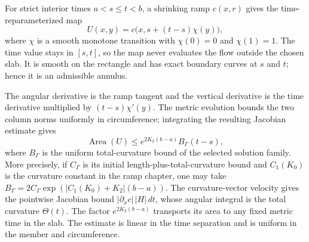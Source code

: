 \begin{lemma}\label{lem:annular-swept}
For strict interior times $a<s\le t<b$, a shrinking ramp $c(x,r)$ gives the
time-reparameterized map
\[
 U(x,y)=c\bigl(x,s+(t-s)\chi(y)\bigr),
\]
where $\chi$ is a smooth monotone transition with $\chi(0)=0$ and
$\chi(1)=1$.  The time value stays in $[s,t]$, so the map never evaluates the
flow outside the chosen slab.  It is smooth on the rectangle and has exact
boundary curves at $s$ and $t$; hence it is an admissible annulus.

The angular derivative is the ramp tangent and the vertical derivative is the
time derivative multiplied by $(t-s)\chi'(y)$.  The metric evolution bounds
the two column norms uniformly in circumference; integrating the resulting
Jacobian estimate gives
\begin{equation}
 \operatorname{Area}(U)\le
 e^{2K_2(b-a)}B_{\Gamma}(t-s),
 \label{eq:swept-area}
\end{equation}
where $B_{\Gamma}$ is the uniform total-curvature bound of the selected
solution family.  More precisely, if $C_{\Gamma}$ is its initial
length-plus-total-curvature bound and $C_1(K_0)$ is the curvature constant
in the ramp chapter, one may take
$B_{\Gamma}=2C_{\Gamma}\exp(|C_1(K_0)+K_2|(b-a))$.
The curvature-vector velocity gives the pointwise Jacobian bound
$|\partial_xc|\,|H|\,dt$, whose angular integral is the total curvature
$\Theta(t)$.  The factor $e^{2K_2(b-a)}$ transports its area to any fixed
metric time in the slab.  The estimate is linear in the time separation and is
uniform in the member and circumference.
\end{lemma}

